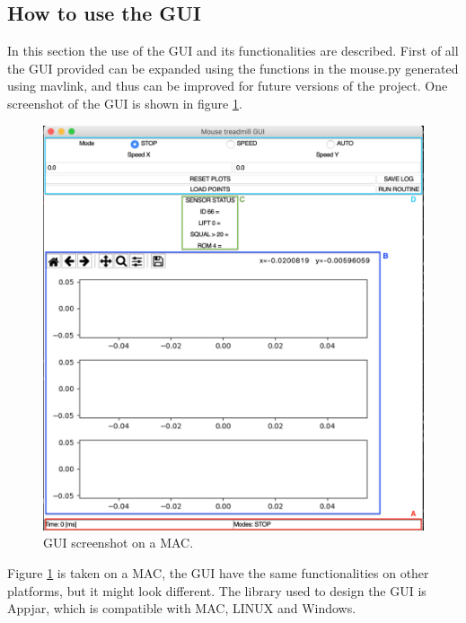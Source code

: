 \documentclass[12pt,a4paper, twoside]{article}
\begin{document}
\subsection{How to use the GUI}  
In this section the use of the GUI and its functionalities are described.
First of all the GUI provided can be expanded using the functions in the mouse.py generated using mavlink, and thus can be improved for future versions of the project. One screenshot of the GUI is shown in figure \ref{fig:GUI}.
\begin{figure}[htp]
	\centering
	\includegraphics[width=1\linewidth]{fig/GUI.png}
	\caption{GUI screenshot on a MAC.}\label{fig:GUI}
\end{figure}
Figure \ref{fig:GUI} is taken on a MAC, the GUI have the same functionalities on other platforms, but it might look different. The library used to design the GUI is Appjar, which is compatible with MAC, LINUX and Windows.
\end{document}
